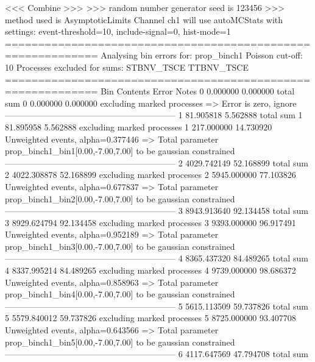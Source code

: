  <<< Combine >>> 
>>> random number generator seed is 123456
>>> method used is AsymptoticLimits
Channel ch1 will use autoMCStats with settings: event-threshold=10, include-signal=0, hist-mode=1
============================================================
Analysing bin errors for: prop_binch1
Poisson cut-off: 10
Processes excluded for sums: STBNV_TSCE TTBNV_TSCE
============================================================
Bin        Contents        Error           Notes                         
0          0.000000        0.000000        total sum                     
0          0.000000        0.000000        excluding marked processes    
  => Error is zero, ignore      
------------------------------------------------------------
1          81.905818       5.562888        total sum                     
1          81.895958       5.562888        excluding marked processes    
1          217.000000      14.730920       Unweighted events, alpha=0.377446
  => Total parameter prop_binch1_bin1[0.00,-7.00,7.00] to be gaussian constrained
------------------------------------------------------------
2          4029.742149     52.168899       total sum                     
2          4022.308878     52.168899       excluding marked processes    
2          5945.000000     77.103826       Unweighted events, alpha=0.677837
  => Total parameter prop_binch1_bin2[0.00,-7.00,7.00] to be gaussian constrained
------------------------------------------------------------
3          8943.913640     92.134458       total sum                     
3          8929.624794     92.134458       excluding marked processes    
3          9393.000000     96.917491       Unweighted events, alpha=0.952189
  => Total parameter prop_binch1_bin3[0.00,-7.00,7.00] to be gaussian constrained
------------------------------------------------------------
4          8365.437320     84.489265       total sum                     
4          8337.995214     84.489265       excluding marked processes    
4          9739.000000     98.686372       Unweighted events, alpha=0.858963
  => Total parameter prop_binch1_bin4[0.00,-7.00,7.00] to be gaussian constrained
------------------------------------------------------------
5          5615.113509     59.737826       total sum                     
5          5579.840012     59.737826       excluding marked processes    
5          8725.000000     93.407708       Unweighted events, alpha=0.643566
  => Total parameter prop_binch1_bin5[0.00,-7.00,7.00] to be gaussian constrained
------------------------------------------------------------
6          4117.647569     47.794708       total sum                     
